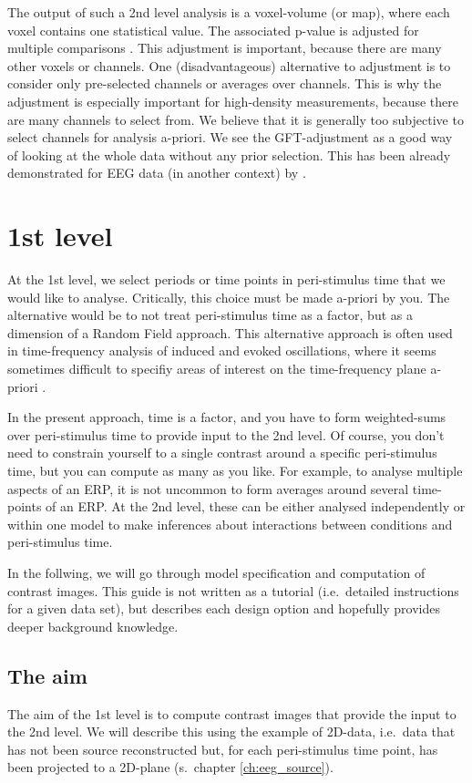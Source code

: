 The output of such a 2nd level analysis is a
voxel-volume (or map), where each voxel contains one statistical
value. The associated p-value is adjusted for multiple
comparisons \cite{kjw_hbf2}. This adjustment is important, because there are many
other voxels or channels. One (disadvantageous) alternative to
adjustment is to consider only pre-selected channels or averages over
channels. This is why the adjustment is especially important for
high-density measurements, because there are many channels to
select from. We believe that it is generally too subjective
to select channels for analysis a-priori. We see the
GFT-adjustment as a good way of looking at the whole data without any
prior selection. This has been already demonstrated for EEG data (in
another context) by \cite{james_rft}.

\section{1st level}
At the 1st level, we select periods or time points in
peri-stimulus time that we would like to analyse. Critically, this
choice must be made a-priori by you. The alternative would be to not
treat peri-stimulus time as a factor, but as a dimension of a Random
Field approach. This alternative approach is often used in
time-frequency analysis of induced and evoked oscillations, where it
seems sometimes difficult to specifiy areas of interest on the
time-frequency plane a-priori \cite{james_rft}. 

In the present approach, time is a factor, and
you have to form weighted-sums over peri-stimulus time to provide
input to the 2nd level. Of course, you don't need to constrain
yourself to a single contrast around a specific peri-stimulus time,
but you can compute as many as you like. For example, to analyse
multiple aspects of an ERP, it is not uncommon to form averages around
several time-points of an ERP. At the 2nd level, these can be either
analysed independently or within one model to make inferences about
interactions between conditions and peri-stimulus time.

In the follwing, we will go through model specification and
computation of contrast images. This guide is not written as a
tutorial (i.e.~detailed instructions for a given data set), but
describes each design option and hopefully provides deeper background
knowledge.

\subsection{The aim}
The aim of the 1st level is to compute contrast images that provide
the input to the 2nd level. We will describe this using the example of
2D-data, i.e.~data that has not been source reconstructed but, for
each peri-stimulus time point, has been projected to a 2D-plane
(s.~chapter \ref{ch:eeg_source}).

